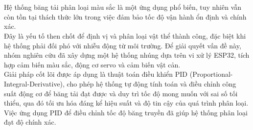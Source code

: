 \chapter*{}

Hệ thống băng tải phân loại màu sắc là một ứng dụng phổ biến, 
tuy nhiên vẫn còn tồn tại thách thức lớn trong việc đảm bảo tốc độ 
vận hành ổn định và chính xác.\\
\indent Đây là yếu tố then chốt để định vị 
và phân loại vật thể thành công, đặc biệt khi hệ thống phải đối phó
với nhiễu động từ môi trường. Để giải quyết vấn đề này, 
nhóm nghiên cứu đã xây dựng một hệ thống nhúng dựa trên 
vi xử lý ESP32, tích hợp cảm biến màu sắc, động cơ servo và 
cảm biến vật cản.\\
\indent Giải pháp cốt lõi được áp dụng là thuật toán 
điều khiển PID (Proportional-Integral-Derivative), cho phép hệ 
thống tự động tính toán và điều chỉnh công suất động cơ để băng 
tải đạt được và duy trì tốc độ mong muốn với sai số tối thiểu, 
qua đó tối ưu hóa đáng kể hiệu suất và độ tin cậy của quá trình 
phân loại. Việc ứng dụng PID để điều chỉnh tốc độ băng truyền đã 
giúp hệ thống phân loại đạt độ chính xác.